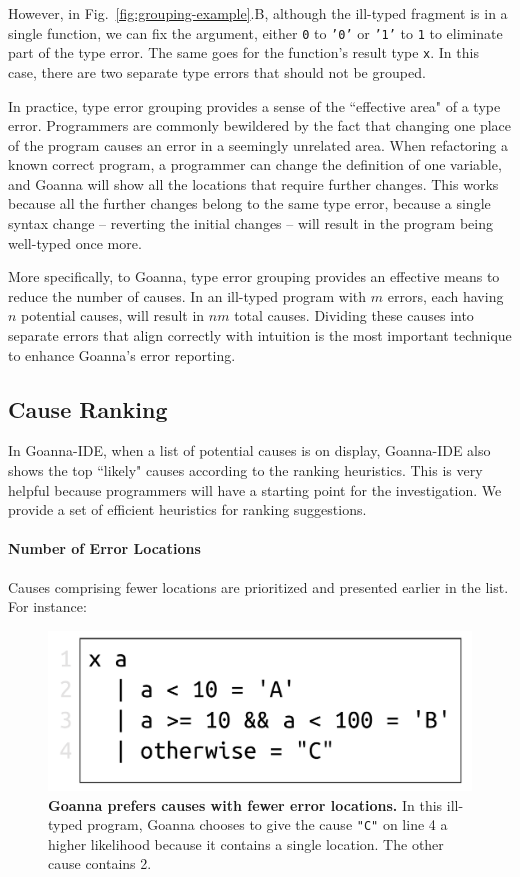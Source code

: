 \documentclass[pdflatex,sn-nature,Numbered]{sn-jnl}%
\begin{document}
    However, in Fig.~\ref{fig:grouping-example}.B, although the ill-typed fragment is in a single function, we can fix the argument, either \texttt{0} to \texttt{'0'} or \texttt{'1'} to \texttt{1} to eliminate part of the type error. The same goes for the function's result type \texttt{x}. In this case, there are two separate type errors that should not be grouped.

	In practice, type error grouping provides a sense of the ``effective area" of a type error. Programmers are commonly bewildered by the fact that changing one place of the program causes an error in a seemingly unrelated area. When refactoring a known correct program, a programmer can change the definition of one variable, and Goanna will show all the locations that require further changes. This works because all the further changes belong to the same type error, because a single syntax change -- reverting the initial changes -- will result in the program being well-typed once more.
	
	More specifically, to Goanna, type error grouping provides an effective means to reduce the number of causes. In an ill-typed program with $m$ errors, each having $n$ potential causes, will result in $nm$ total causes. Dividing these causes into separate errors that align correctly with intuition is the most important technique to enhance Goanna's error reporting.

    \subsection{Cause Ranking} \label{sub:ranking}
     In Goanna-IDE, when a list of potential causes is on display, Goanna-IDE also shows the top ``likely" causes according to the ranking heuristics. This is very helpful because programmers will have a starting point for the investigation. We provide a set of efficient heuristics for ranking suggestions. 

    \paragraph{Number of Error Locations}
    Causes comprising fewer locations are prioritized and presented earlier in the list. For instance:
   \begin{figure}[ht!]
        \centering
        \includegraphics[width=0.5\linewidth]{images/Loc-Count}
        \caption[Goanna prefers causes with fewer error locations]{\textbf{Goanna prefers causes with fewer error locations.} In this ill-typed program, Goanna chooses to give the cause \texttt{"C"} on line 4 a higher likelihood because it contains a single location. The other cause contains 2. }
        \label{fig:loc-count}
    \end{figure}
\end{document}
